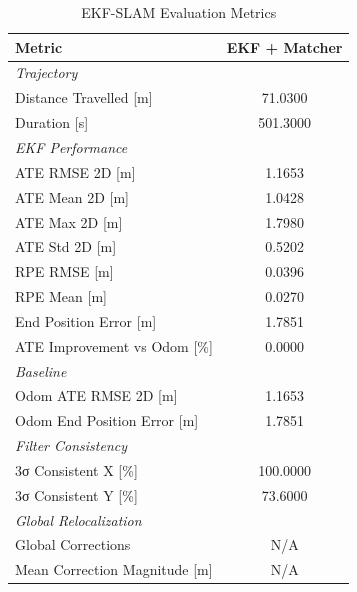 \begin{table}[htbp]
\centering
\caption{EKF-SLAM Evaluation Metrics}
\label{tab:ekf_results}
\begin{tabular}{lc}
\toprule
Metric & \textbf{EKF + Matcher} \\
\midrule
\multicolumn{2}{l}{\textit{Trajectory}} \\
Distance Travelled [m] & 71.0300 \\
Duration [s] & 501.3000 \\
\midrule
\multicolumn{2}{l}{\textit{EKF Performance}} \\
ATE RMSE 2D [m] & 1.1653 \\
ATE Mean 2D [m] & 1.0428 \\
ATE Max 2D [m] & 1.7980 \\
ATE Std 2D [m] & 0.5202 \\
RPE RMSE [m] & 0.0396 \\
RPE Mean [m] & 0.0270 \\
End Position Error [m] & 1.7851 \\
ATE Improvement vs Odom [\%] & 0.0000 \\
\midrule
\multicolumn{2}{l}{\textit{Baseline}} \\
Odom ATE RMSE 2D [m] & 1.1653 \\
Odom End Position Error [m] & 1.7851 \\
\midrule
\multicolumn{2}{l}{\textit{Filter Consistency}} \\
3σ Consistent X [\%] & 100.0000 \\
3σ Consistent Y [\%] & 73.6000 \\
\midrule
\multicolumn{2}{l}{\textit{Global Relocalization}} \\
Global Corrections & N/A \\
Mean Correction Magnitude [m] & N/A \\
\midrule
\bottomrule
\end{tabular}
\end{table}